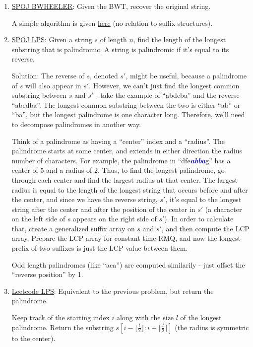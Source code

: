 \documentclass[11pt, oneside]{article}
\newcommand{\emphasis}[1]{\textcolor{blue}{\textbf{\textit{#1}}}}
\begin{document}
\begin{enumerate}
  \item \href{http://www.spoj.com/problems/BWHEELER/}{SPOJ BWHEELER}:
  Given the BWT, recover the original string.

  A simple algorithm is given \href{https://www.cs.helsinki.fi/u/tpkarkka/opetus/12s/spa/lecture11.pdf}{here} (no relation to suffix structures).

  \item \href{https://www.spoj.com/problems/LPS/}{SPOJ LPS}:
  Given a string \( s \) of length \( n \), find the length of the longest substring that is palindromic. A string is palindromic if it's equal to its reverse.

  Solution: The reverse of \( s \), denoted \( s' \), might be useful, because a palindrome of \( s \)
  will also appear in \( s' \). However, we can't just find the longest common substring
  between \( s \) and \( s' \) - take the example of ``abdeba'' and the reverse ``abedba''.
  The longest common substring between the two is either ``ab'' or ``ba'', but the longest palindrome
  is one character long. Therefore, we'll need to decompose palindromes in another way.

  Think of a palindrome as having a ``center'' index and a ``radius''.
  The palindrome starts at some center, and extends in either direction the radius number of characters.
  For example, the palindrome in ``dfe\emphasis{abba}g'' has a center of 5 and a radius of 2.
  Thus, to find the longest palindrome, go through each center and find the largest radius at that center.
  The largest radius is equal to the length of the longest string that occurs before and after the center,
  and since we have the reverse string, \( s' \), it's equal to the longest string after the center
  and after the position of the center in \( s' \)
  (a character on the left side of \( s \) appears on the right side of \( s' \)).
  In order to calculate that, create a generalized suffix array on \( s \) and \( s' \),
  and then compute the LCP array. Prepare the LCP array for constant time RMQ, and
  now the longest prefix of two suffixes is just the LCP value between them.

  Odd length palindromes (like ``aca'') are computed similarily - just offset the ``reverse position'' by 1.

  \item \href{https://leetcode.com/problems/longest-palindromic-substring/}{Leetcode LPS}:
  Equivalent to the previous problem, but return the palindrome.

  Keep track of the starting index \( i \) along with the size \( l \) of the longest palindrome.
  Return the substring \( s[i - \lfloor \frac{l}{2} \rfloor: i + \lceil \frac{l}{2} \rceil] \) (the radius is symmetric to the center).


\end{enumerate}
\end{document}
